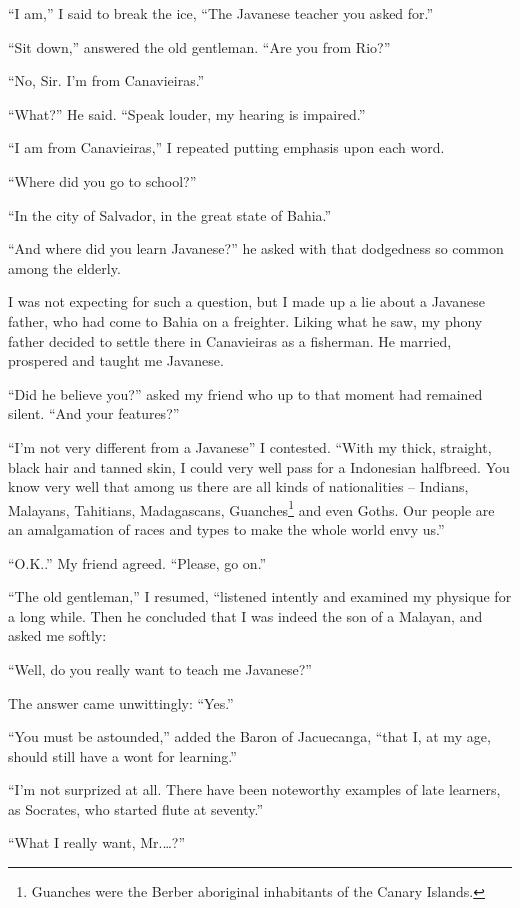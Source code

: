 \documentclass[a4paper,12pt]{book}
\begin{document}
``I am,'' I said to break the ice,
``The Javanese teacher you asked for.''

``Sit down,'' answered the old gentleman.
``Are you from Rio?''

``No, Sir. I'm from Canavieiras.''

``What?'' He said. ``Speak louder, my hearing is impaired.''

``I am from Canavieiras,'' I repeated putting emphasis
upon each word.

``Where did you go to school?''

``In the city of Salvador, in the great state of Bahia.''

``And where did you learn Javanese?'' he
asked with that dodgedness so common among the elderly.

I was not expecting for such a question,
but I made up a lie about a
Javanese father, who had come to Bahia
on a freighter. Liking what he saw,
my phony father decided to
settle there in Canavieiras as a fisherman.
He married, prospered and taught me Javanese.

``Did he believe you?'' asked my friend
who up to that moment had remained silent.
``And your features?''

``I'm not very different from a Javanese''
I contested. ``With my thick, straight, black hair
and tanned skin, I could very well pass for
a Indonesian halfbreed. You know very well
that among us there are all kinds of nationalities
-- Indians, Malayans, Tahitians, Madagascans,
Guanches\footnote{Guanches were the Berber aboriginal
inhabitants of the Canary Islands.}
and even Goths. Our people are an amalgamation
of races and types to make the whole world envy us.''

``O.K..'' My friend agreed. ``Please, go on.''

``The old gentleman,''  I resumed,
``listened intently and examined my physique
for a long while. Then he concluded that I was
indeed the son of a Malayan, and asked me softly:

``Well, do you really want to teach me Javanese?''

The answer came unwittingly: ``Yes.''

``You must be astounded,'' added the Baron
of Jacuecanga, ``that I, at my age, should
still have a wont for learning.''

``I'm not surprized at all. There have been
noteworthy examples of late learners,
as Socrates, who started flute at seventy.''

``What I really want, Mr.\ldots?''
\end{document}

